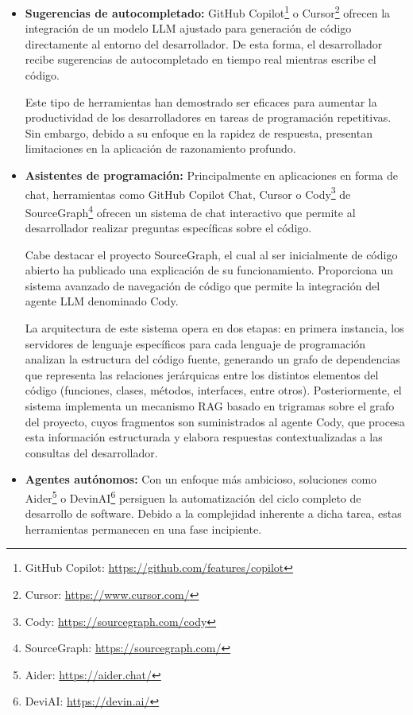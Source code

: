 \begin{itemize}
  \item {\textbf{Sugerencias de autocompletado:}} GitHub Copilot\footnote{GitHub Copilot: \url{https://github.com/features/copilot}} o Cursor\footnote{Cursor: \url{https://www.cursor.com/}} ofrecen la integración de un modelo LLM ajustado para generación de código directamente al entorno del desarrollador. De esta forma, el desarrollador recibe sugerencias de autocompletado en tiempo real mientras escribe el código.  

Este tipo de herramientas han demostrado ser eficaces para aumentar la productividad de los desarrolladores en tareas de programación repetitivas\cite{kalliamvakou_research_2022}. Sin embargo, debido a su enfoque en la rapidez de respuesta, presentan limitaciones en la aplicación de razonamiento profundo.

\item {\textbf{Asistentes de programación:}} Principalmente en aplicaciones en forma de chat, herramientas como GitHub Copilot Chat, Cursor o Cody\footnote{Cody: \url{https://sourcegraph.com/cody}} de SourceGraph\footnote{SourceGraph: \url{https://sourcegraph.com/}} ofrecen un sistema de chat interactivo que permite al desarrollador realizar preguntas específicas sobre el código\cite{noauthor_github_nodate}.
  
Cabe destacar el proyecto SourceGraph, el cual al ser inicialmente de código abierto ha publicado una explicación de su funcionamiento. Proporciona un sistema avanzado de navegación de código que permite la integración del agente LLM denominado Cody.

La arquitectura de este sistema opera en dos etapas: en primera instancia, los servidores de lenguaje específicos para cada lenguaje de programación analizan la estructura del código fuente, generando un grafo de dependencias que representa las relaciones jerárquicas entre los distintos elementos del código (funciones, clases, métodos, interfaces, entre otros)\cite{noauthor_sourcegraphscip_2025}. Posteriormente, el sistema implementa un mecanismo RAG basado en trigramas sobre el grafo del proyecto, cuyos fragmentos son suministrados al agente Cody, que procesa esta información estructurada y elabora respuestas contextualizadas a las consultas del desarrollador\cite{noauthor_sourcegraphsourcegraph-public-snapshot_nodate}.

\item {\textbf{Agentes autónomos:}} Con un enfoque más ambicioso, soluciones como Aider\footnote{Aider: \url{https://aider.chat/}} o DevinAI\footnote{DeviAI: \url{https://devin.ai/}} persiguen la automatización del ciclo completo de desarrollo de software. Debido a la complejidad inherente a dicha tarea, estas herramientas permanecen en una fase incipiente\cite{acharya_devin_2025}.


\end{itemize}
